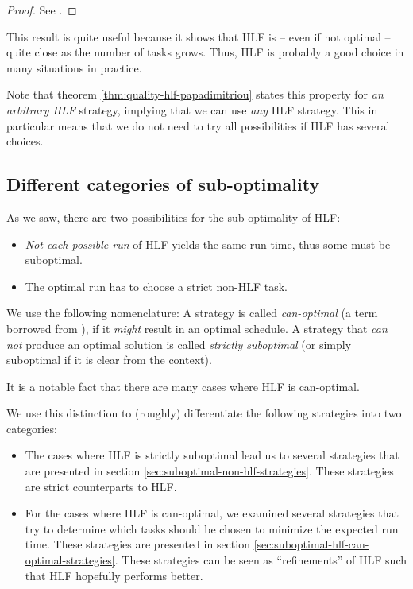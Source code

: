 \begin{proof}
  See \cite{journals/siamcomp/PapadimitriouT87}.
\end{proof}

This result is quite useful because it shows that HLF is -- even if not optimal -- quite close as the number of tasks grows. Thus, HLF is probably a good choice in many situations in practice.

Note that theorem \ref{thm:quality-hlf-papadimitriou} states this property for \emph{an arbitrary HLF} strategy, implying that we can use \emph{any} HLF strategy. This in particular means that we do not need to try all possibilities if HLF has several choices.

\subsection{Different categories of sub-optimality}
\label{sec:hlf-suboptimal-two-variants}

As we saw, there are two possibilities for the sub-optimality of HLF:

\begin{itemize}
\item \emph{Not each possible run} of HLF yields the same run time, thus some must be suboptimal.
\item The optimal run has to choose a strict non-HLF task.
\end{itemize}

We use the following nomenclature: A strategy is called \emph{can-optimal} (a term borrowed from \cite{MoritzMaasDiploma}), if it \emph{might} result in an optimal schedule. A strategy that \emph{can not} produce an optimal solution is called \emph{strictly suboptimal} (or simply suboptimal if it is clear from the context). 

It is a notable fact that there are many cases where HLF is can-optimal. 

We use this distinction to (roughly) differentiate the following strategies into two categories: 

\begin{itemize}
\item The cases where HLF is strictly suboptimal lead us to several strategies that are presented in section \ref{sec:suboptimal-non-hlf-strategies}. These strategies are strict counterparts to HLF.
\item For the cases where HLF is can-optimal, we examined several strategies that try to determine which tasks should be chosen to minimize the expected run time. These strategies are presented in section \ref{sec:suboptimal-hlf-can-optimal-strategies}. These strategies can be seen as ``refinements'' of HLF such that HLF hopefully performs better.
\end{itemize}

